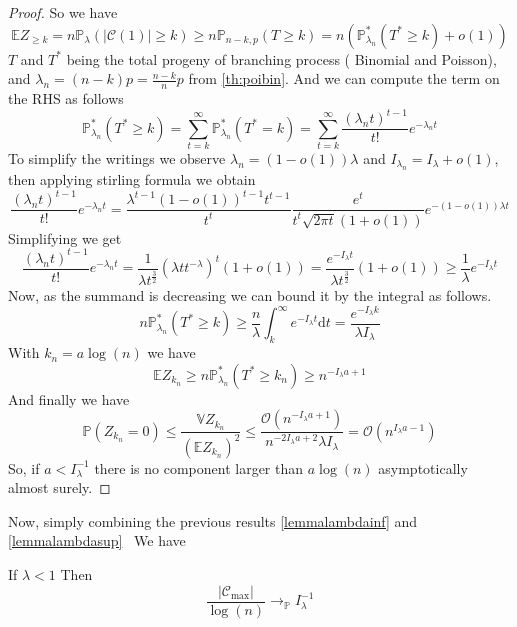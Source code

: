 \begin{proof}
	So we have
	\begin{equation}
		\mathbb{E} Z_{\geq k} = n \mathbb{P}_{\lambda}(|\mathcal{C}(1)| \geq k) \geq n \mathbb{P}_{n-k, p}(T \geq k) 
		= n(\mathbb{P}_{\lambda_n}^*(T^* \geq k) + o(1) )
	\end{equation}
	$T$ and $T^*$ being the total progeny of branching process ( Binomial and Poisson), and $\lambda_n = (n-k)p = \frac{n-k}{n}p$ from \ref{th:poibin}.
	\newline
	And we can compute the term on the RHS as follows
	\begin{equation}
		\mathbb{P}_{\lambda_n}^*(T^* \geq k)
		 = \sum_{t=k}^{\infty} \mathbb{P}_{\lambda_n}^*(T^* = k)
		 = \sum_{t=k}^{\infty} \frac{(\lambda_n t)^{t-1}}{t!} e^{-\lambda_n t}
	\end{equation}
	To simplify the writings we observe $\lambda_n = (1-o(1))\lambda$ and $I_{\lambda_n} = I_{\lambda} + o(1)$, then applying stirling formula we obtain
	\begin{equation}
		\frac{(\lambda_n t)^{t-1}}{t!} e^{-\lambda_n t}
		= \frac{\lambda^{t-1} (1-o(1))^{t-1}t^{t-1}}{t^t} \frac{e^t}{t^t\sqrt{2\pi t}(1 + o(1))} e^{-(1-o(1))\lambda t}	
	\end{equation}
	Simplifying we get
	\begin{equation}
		\frac{(\lambda_n t)^{t-1}}{t!} e^{-\lambda_n t}
		= \frac{1}{\lambda t^{\frac{3}{2}}}(\lambda t t^{-\lambda})^t (1 + o(1))
		= \frac{e^{-I_{\lambda} t }}{\lambda t^{\frac{3}{2}}} (1 + o(1)) \geq \frac{1}{\lambda}e^{-I_{\lambda} t}
	\end{equation}
	Now, as the summand is decreasing we can bound it by the integral as follows.
	\begin{equation}
		n\mathbb{P}_{\lambda_n}^*(T^* \geq k)
		\geq \frac{n}{\lambda} \int_{k}^{\infty} e^{-I_{\lambda} t} \mathrm{d}t
		 = \frac{e^{-I_{\lambda} k}}{\lambda I_{\lambda}}
	\end{equation}
	With $k_n = a\log(n)$ we have 
	\begin{equation}
		\mathbb{E} Z_{k_n} \geq n\mathbb{P}_{\lambda_n}^*(T^* \geq k_n) \geq n^{-I_{\lambda} a + 1}
	\end{equation}
	And finally we have
	\begin{equation}
		\mathbb{P}(Z_{k_n} = 0) \leq \frac{\mathbb{V}Z_{k_n}}{(\mathbb{E}Z_{k_n})^2} \leq \frac{\mathcal{O}(n^{-I_{\lambda}a + 1})}{n^{-2I_{\lambda}a + 2} \lambda I_{\lambda}} 
			= \mathcal{O}(n^{I_{\lambda}a - 1})
	\end{equation}
	So, if $a<I_{\lambda}^{-1}$ there is no component larger than $a\log(n)$ asymptotically almost surely.
\end{proof}
Now, simply combining the previous results \ref{lemmalambdainf} and \ref{lemmalambdasup}  We have
\begin{theorem}
	If $\lambda < 1$
	\newline
	Then
	\begin{equation}
		\frac{|\mathcal{C}_{\max}|}{\log(n)} \longrightarrow_\mathbb{P} I_{\lambda}^{-1}
	\end{equation}
\end{theorem}

